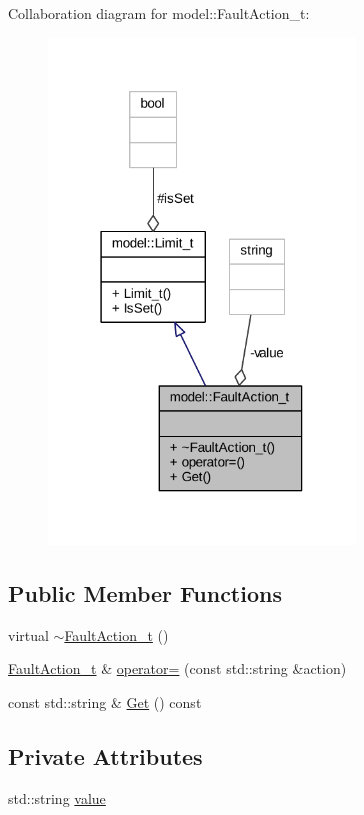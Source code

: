 Collaboration diagram for model\+:\+:Fault\+Action\+\_\+t\+:
\nopagebreak
\begin{figure}[H]
\begin{center}
\leavevmode
\includegraphics[width=231pt]{classmodel_1_1_fault_action__t__coll__graph}
\end{center}
\end{figure}
\subsection*{Public Member Functions}
\begin{DoxyCompactItemize}
\item 
virtual \hyperlink{classmodel_1_1_fault_action__t_ac25d0c980f83e55c91bacc0fb2496e5c}{$\sim$\+Fault\+Action\+\_\+t} ()
\item 
\hyperlink{classmodel_1_1_fault_action__t}{Fault\+Action\+\_\+t} \& \hyperlink{classmodel_1_1_fault_action__t_aed7d0701ea6bcfc30931a4d15e09ec71}{operator=} (const std\+::string \&action)
\item 
const std\+::string \& \hyperlink{classmodel_1_1_fault_action__t_aea141d13a1be488ffa7132e606df4b12}{Get} () const 
\end{DoxyCompactItemize}
\subsection*{Private Attributes}
\begin{DoxyCompactItemize}
\item 
std\+::string \hyperlink{classmodel_1_1_fault_action__t_a7cf3ba85489fa5a82821541f11e906a0}{value}
\end{DoxyCompactItemize}

